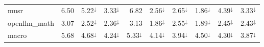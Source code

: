 {\begin{tabular}{lrrrrrrrrr}
musr & 6.50 & 5.22$^{\downarrow}$ & 3.33$^{\downarrow}$ & 6.82 & 2.56$^{\downarrow}$ & 2.65$^{\downarrow}$ & 1.86$^{\downarrow}$ & 4.39$^{\downarrow}$ & 3.33$^{\downarrow}$ \\
openllm\_math & 3.07 & 2.52$^{\downarrow}$ & 2.36$^{\downarrow}$ & 3.13 & 1.86$^{\downarrow}$ & 2.55$^{\downarrow}$ & 1.89$^{\downarrow}$ & 2.45$^{\downarrow}$ & 2.43$^{\downarrow}$ \\
\midrule
macro & 5.68 & 4.68$^{\downarrow}$ & 4.24$^{\downarrow}$ & 5.33$^{\downarrow}$ & 4.14$^{\downarrow}$ & 3.94$^{\downarrow}$ & 4.50$^{\downarrow}$ & 4.30$^{\downarrow}$ & 3.87$^{\downarrow}$ \\
\bottomrule
\end{tabular}}

